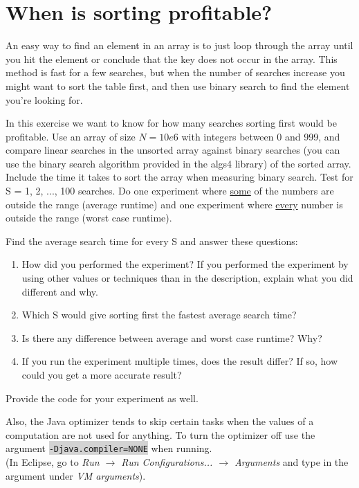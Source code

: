 \documentclass[11pt]{article}
\begin{document}
\section{When is sorting profitable?}
An easy way to find an element in an array is to just loop through the array until you hit the element or conclude that the key does not occur in the array. This method is fast for a few searches, but when the number of searches increase you might want to sort the table first, and then use binary search to find the element you're looking for.

In this exercise we want to know for how many searches sorting first would be profitable. Use an array of size $N=10e6$ with integers between 0 and 999, and compare linear searches in the unsorted array against binary searches (you can use the binary search algorithm provided in the algs4 library) of the sorted array. Include the time it takes to sort the array when measuring binary search. Test for S = 1, 2, ..., 100 searches. Do one experiment where \underline{some} of the numbers are outside the range (average runtime) and one experiment where \underline{every} number is outside the range (worst case runtime).

Find the average search time for every S and answer these questions:
\begin{enumerate}
  \item How did you performed the experiment? If you performed the experiment by using other values or techniques than in the description, explain what you did different and why.
  \item Which S would give sorting first the fastest average search time?
  \item Is there any difference between average and worst case runtime? Why?
  \item If you run the experiment multiple times, does the result differ? If so, how could you get a more accurate result?
\end{enumerate}

Provide the code for your experiment as well.

Also, the Java optimizer tends to skip certain tasks when the values of a computation are not used for anything. To turn the optimizer off use the argument \colorbox{lightgray}{\lstinline{-Djava.compiler=NONE}} when running.
\\ (In Eclipse, go to \textit{Run $\rightarrow$ Run Configurations... $\rightarrow$ Arguments} and type in the argument under \textit{VM arguments}).
\end{document}
